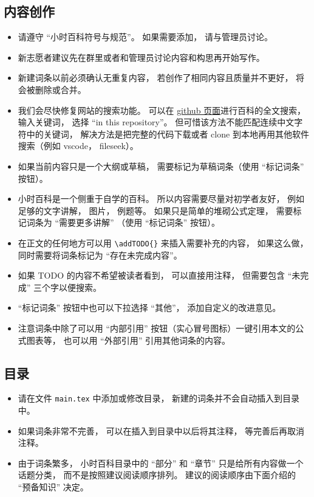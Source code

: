 
\subsection{内容创作}
\begin{itemize}
\item 请遵守 “小时百科符号与规范”。 如果需要添加， 请与管理员讨论。
\item 新志愿者建议先在群里或者和管理员讨论内容和构思再开始写作。
\item 新建词条以前必须确认无重复内容， 若创作了相同内容且质量并不更好， 将会被删除或合并。
\item 我们会尽快修复网站的搜索功能。 可以在 \href{https://github.com/MacroUniverse/PhysWiki-log}{github 页面}进行百科的全文搜索， 输入关键词， 选择 “in this repository”。 但可惜该方法不能匹配连续中文字符中的关键词， 解决方法是把完整的代码下载或者 clone 到本地再用其他软件搜索（例如 vscode， fileseek）。
\item 如果当前内容只是一个大纲或草稿， 需要标记为草稿词条（使用 “标记词条” 按钮）。
\item 小时百科是一个侧重于自学的百科。 所以内容需要尽量对初学者友好， 例如足够的文字讲解， 图片， 例题等。 如果只是简单的堆砌公式定理， 需要标记词条为 “需要更多讲解” （使用 “标记词条” 按钮）。
\item 在正文的任何地方可以用 \verb|\addTODO{}| 来插入需要补充的内容， 如果这么做， 同时需要将词条标记为 “存在未完成内容”。
\item 如果 TODO 的内容不希望被读者看到， 可以直接用注释， 但需要包含 “未完成” 三个字以便搜索。
\item “标记词条” 按钮中也可以下拉选择 “其他”， 添加自定义的改进意见。
\item 注意词条中除了可以用 “内部引用” 按钮（实心冒号图标）一键引用本文的公式图表等， 也可以用 “外部引用” 引用其他词条的内容。
\end{itemize}

\subsection{目录}
\begin{itemize}
\item 请在文件 \verb|main.tex| 中添加或修改目录， 新建的词条并不会自动插入到目录中。
\item 如果词条非常不完善， 可以在插入到目录中以后将其注释， 等完善后再取消注释。
\item 由于词条繁多， 小时百科目录中的 “部分” 和 “章节” 只是给所有内容做一个话题分类， 而不是按照建议阅读顺序排列。 建议的阅读顺序由下面介绍的 “预备知识” 决定。
\end{itemize}


